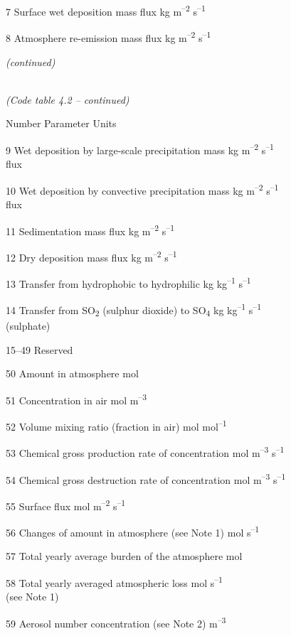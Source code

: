 7 Surface wet deposition mass flux kg m\textsuperscript{--2} s\textsuperscript{--1}

8 Atmosphere re-emission mass flux kg m\textsuperscript{--2} s\textsuperscript{--1}

\emph{(continued)}

\emph{\\
(Code table 4.2 -- continued)}

Number Parameter Units

9 Wet deposition by large-scale precipitation mass kg m\textsuperscript{--2} s\textsuperscript{--1}\\
flux

10 Wet deposition by convective precipitation mass kg m\textsuperscript{--2} s\textsuperscript{--1}\\
flux

11 Sedimentation mass flux kg m\textsuperscript{--2} s\textsuperscript{--1}

12 Dry deposition mass flux kg m\textsuperscript{--2} s\textsuperscript{--1}

13 Transfer from hydrophobic to hydrophilic kg kg\textsuperscript{--1} s\textsuperscript{--1}

14 Transfer from SO\textsubscript{2} (sulphur dioxide) to SO\textsubscript{4} kg kg\textsuperscript{--1} s\textsuperscript{--1}\\
(sulphate)

15--49 Reserved

50 Amount in atmosphere mol

51 Concentration in air mol m\textsuperscript{--3}

52 Volume mixing ratio (fraction in air) mol mol\textsuperscript{--1}

53 Chemical gross production rate of concentration mol m\textsuperscript{--3} s\textsuperscript{--1}

54 Chemical gross destruction rate of concentration mol m\textsuperscript{--3} s\textsuperscript{--1}

55 Surface flux mol m\textsuperscript{--2} s\textsuperscript{--1}

56 Changes of amount in atmosphere (see Note 1) mol s\textsuperscript{--1}

57 Total yearly average burden of the atmosphere mol

58 Total yearly averaged atmospheric loss mol s\textsuperscript{--1}\\
(see Note 1)

59 Aerosol number concentration (see Note 2) m\textsuperscript{--3}

